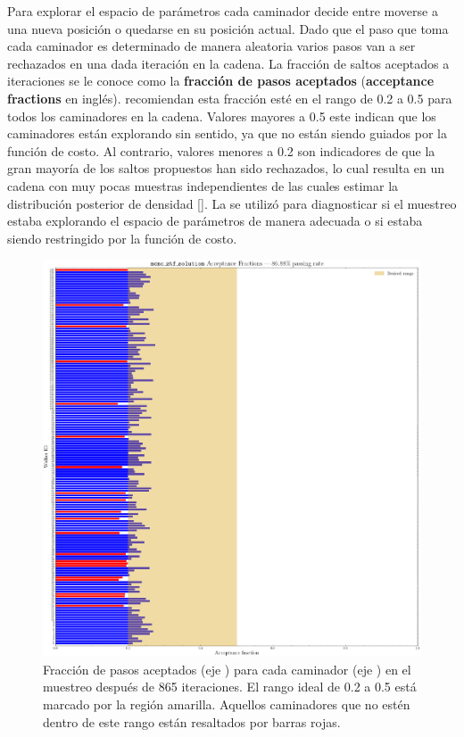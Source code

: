 Para explorar el espacio de parámetros cada caminador decide entre moverse a una
nueva posición o quedarse en su posición actual. Dado que el paso que toma cada
caminador es determinado de manera aleatoria varios pasos van a ser rechazados
en una dada iteración en la cadena. La fracción de saltos aceptados a
iteraciones se le conoce como la \textbf{fracción de pasos aceptados}
(\textbf{acceptance fractions} en inglés).
recomiendan esta fracción esté en el rango de 0.2 a 0.5 para todos los
caminadores en la cadena. Valores mayores a 0.5 este indican que los caminadores
están explorando sin sentido, ya que no están siendo guiados por la función de
costo. Al contrario, valores menores a 0.2 son indicadores de que la gran
mayoría de los saltos propuestos han sido rechazados, lo cual resulta en un
cadena con muy pocas muestras independientes de las cuales estimar la
distribución posterior de densidad [].
La  se utilizó para diagnosticar si el
muestreo estaba explorando el espacio de parámetros de manera adecuada o si
estaba siendo restringido por la función de costo.

\begin{figure}[!ht]
	\centering
	\includegraphics[scale=0.41]{Metodologia/Secciones/ModeloComputacional/Figures/Figura MCMC ZTF Acceptance Fractions.png}
	\caption{Fracción de pasos aceptados (eje ) para cada caminador (eje
	) en el muestreo después de 865 iteraciones. El rango ideal de 0.2 a
	0.5 está marcado por la región amarilla. Aquellos caminadores que no estén
	dentro de este rango están resaltados por barras rojas.}
	\label{figuraFraccionPasosAceptados}
\end{figure}

